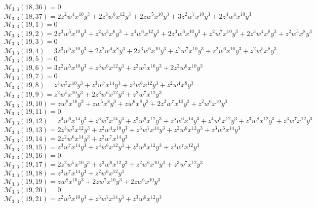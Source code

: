 \documentclass[12pt]{memoireuqam1.3}
\begin{document}
$\mathcal{M}_{3,3}(18,36)=0$\\
$\mathcal{M}_{3,3}(18,37)=2z^2w^4x^{10}y^3+2z^3w^6x^{12}y^3+2zw^5x^{10}y^3+3z^2w^7x^{10}y^3+2z^4w^4x^{10}y^3$\\
$\mathcal{M}_{3,3}(19,1)=0$\\
$\mathcal{M}_{3,3}(19,2)=2z^3w^5x^{10}y^3+z^2w^3x^6y^3+z^3w^6x^{12}y^3+2z^3w^6x^{10}y^3+z^2w^7x^{10}y^3+2z^3w^4x^8y^3+z^2w^5x^8y^3$\\
$\mathcal{M}_{3,3}(19,3)=0$\\
$\mathcal{M}_{3,3}(19,4)=3z^3w^5x^{10}y^3+2z^2w^4x^8y^3+2z^3w^6x^{10}y^3+z^2w^7x^{10}y^3+z^2w^6x^{10}y^3+z^2w^5x^8y^3$\\
$\mathcal{M}_{3,3}(19,5)=0$\\
$\mathcal{M}_{3,3}(19,6)=3z^2w^5x^{10}y^3+z^3w^6x^{12}y^3+z^2w^7x^{10}y^3+2z^2w^6x^{10}y^3$\\
$\mathcal{M}_{3,3}(19,7)=0$\\
$\mathcal{M}_{3,3}(19,8)=z^3w^5x^{10}y^3+z^3w^7x^{14}y^3+z^3w^6x^{12}y^3+z^2w^4x^8y^3$\\
$\mathcal{M}_{3,3}(19,9)=z^2w^5x^{10}y^3+2z^3w^6x^{12}y^3+z^2w^7x^{12}y^3$\\
$\mathcal{M}_{3,3}(19,10)=zw^8x^{10}y^3+zw^5x^8y^3+zw^6x^8y^3+2z^2w^7x^{10}y^3+z^2w^6x^{10}y^3$\\
$\mathcal{M}_{3,3}(19,11)=0$\\
$\mathcal{M}_{3,3}(19,12)=z^4w^6x^{14}y^3+z^3w^7x^{14}y^3+z^3w^6x^{12}y^3+z^5w^6x^{14}y^3+z^4w^5x^{12}y^3+z^3w^8x^{12}y^3+z^3w^7x^{12}y^3$\\
$\mathcal{M}_{3,3}(19,13)=2z^3w^5x^{12}y^3+z^2w^4x^{10}y^3+z^3w^7x^{14}y^3+z^2w^6x^{12}y^3+z^3w^6x^{14}y^3$\\
$\mathcal{M}_{3,3}(19,14)=2z^2w^6x^{14}y^3+z^2w^7x^{14}y^3$\\
$\mathcal{M}_{3,3}(19,15)=z^3w^7x^{14}y^3+z^3w^6x^{12}y^3+z^3w^8x^{12}y^3+z^3w^7x^{12}y^3$\\
$\mathcal{M}_{3,3}(19,16)=0$\\
$\mathcal{M}_{3,3}(19,17)=2z^2w^5x^{10}y^3+z^3w^6x^{12}y^3+z^2w^6x^{10}y^3+z^3w^7x^{12}y^3$\\
$\mathcal{M}_{3,3}(19,18)=z^3w^7x^{14}y^3+z^2w^6x^{12}y^3$\\
$\mathcal{M}_{3,3}(19,19)=zw^8x^{10}y^3+2zw^7x^{10}y^3+2zw^6x^{10}y^3$\\
$\mathcal{M}_{3,3}(19,20)=0$\\
$\mathcal{M}_{3,3}(19,21)=z^2w^5x^{10}y^3+z^3w^7x^{14}y^3+z^3w^6x^{12}y^3$\\
\end{document}
